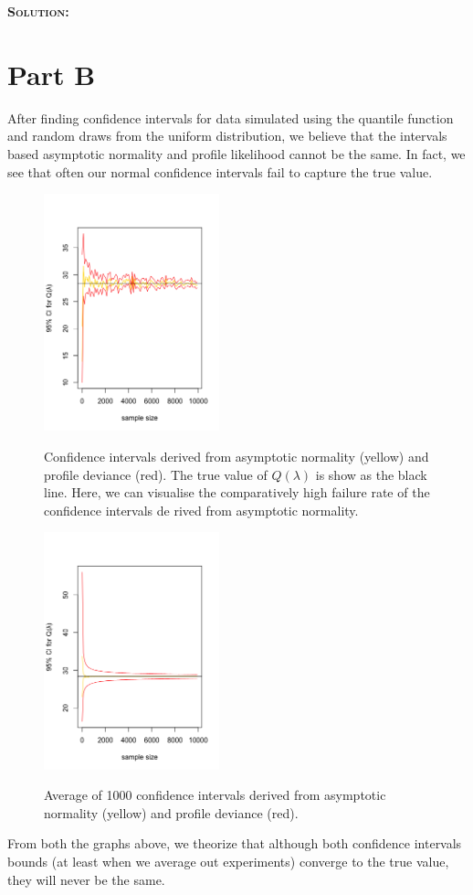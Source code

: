 \documentclass[12pt,oneside]{article}
\newenvironment{solution}
    {\textbf{\textsc{Solution:}}\\}
    {\newpage}
\begin{document}
\begin{solution}
\section*{Part B}
After finding confidence intervals for data simulated using the quantile function and random draws from the uniform distribution, we believe that the intervals based asymptotic normality and profile likelihood cannot be the same. In fact, we see that often our normal confidence intervals fail to capture the true value. 
\begin{figure}[H]
\begin{center}
{\includegraphics[width=2in]{a1/graph1.png}}
\caption{Confidence intervals derived from asymptotic normality (yellow) and profile deviance (red). The true value of $Q(\lambda)$ is show as the black line. Here, we can visualise the comparatively high failure rate of the confidence intervals de
rived from asymptotic normality. }
\end{center}
\end{figure}


\begin{figure}[H]
\begin{center}
{\includegraphics[width=2in]{a1/graph2.png}}
\caption{Average of 1000 confidence intervals derived from asymptotic normality (yellow) and profile deviance (red).}
\end{center}
\end{figure}
From both the graphs above, we theorize that although both confidence intervals bounds (at least when we average out experiments) converge to the true value, they will never be the same. 


\end{solution}
\end{document}
